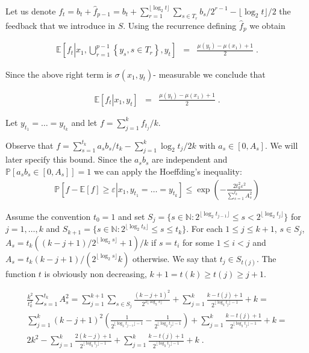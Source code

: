 \documentclass{article}
\numberwithin{equation}{section}
\theoremstyle{plain}
\theoremstyle{plain}
\theoremstyle{plain}
\theoremstyle{remark}
\theoremstyle{remark}
\newcommand{\1}{\ensuremath{\mathbbm{1}}}
\newcommand{\N}{\mathbb{N}}
\newcommand{\E}{\mathbb{E}}
\newcommand{\PP}{\mathbb{P}}
\newcommand{\Dfrac}[2]{{\displaystyle \frac{#1}{#2}}}
\begin{document}
Let us denote $f_{t}=b_{t}+\hat{f}_{p-1}=b_{t}+\sum_{r=1}^{\lfloor\log_{2}t\rfloor}\sum_{s\in T_{r}}b_{s}/2^{r-1}-\lfloor\log_{2}t\rfloor/2$ the feedback that we introduce in $S$. Using the recurrence defining $\hat{f}_{p}$ we obtain

\begin{eqnarray*}
\E\left[f_{t}\left|x_{1},\bigcup_{r=1}^{p-1}\left\{y_{s},s\in T_{r}\right\}, y_{t}\right.\right] &=& \Dfrac{\mu\left(y_{t}\right)-\mu\left(x_{1}\right)+1}{2}\;.
\end{eqnarray*}

Since the above right term is $\sigma(x_{1},y_{t})$- measurable we conclude that

\begin{eqnarray*}
\E\left[f_{t}\left|x_{1},y_{t}\right.\right] &=& \Dfrac{\mu\left(y_{t}\right)-\mu\left(x_{1}\right)+1}{2}\;.
\end{eqnarray*}

Let $y_{t_{1}}=\ldots=y_{t_{k}}$ and let $f=\sum_{j=1}^{k}f_{t_{j}}/k$. 


Observe that $f=\sum_{s=1}^{t_{k}}a_{s}b_{s}/t_{k}-\sum_{j=1}^{k}\log_{2}t_{j}/2k$ with $a_{s}\in[0,A_{s}]$. We will later specify this bound. Since the $a_{s}b_{s}$ are independent and $\PP[a_{s}b_{s}\in[0,A_{s}]]=1$ we can apply the Hoeffding's inequality:
\begin{eqnarray*}
\PP\left[f-\E\left[f\right]\geq\varepsilon\left|x_{1},y_{t_{1}}=\ldots=y_{t_{k}}\right.\right]\leq \exp\left(-\frac{2t_{k}^{2}\varepsilon^{2}}{\sum_{s=1}^{t_{k}}A_{s}^{2}}\right)
\end{eqnarray*}

Assume the convention $t_{0}=1$ and set $S_{j}=\{s\in\N:2^{\lfloor\log_{2} t_{j-1}\rfloor}\leq s<2^{\lfloor\log_{2} t_{j}\rfloor}\}$ for $j=1,\ldots,k$ and $S_{k+1}=\{s\in\N:2^{\lfloor\log_{2} t_{k}\rfloor}\leq s\leq t_{k}\}$. For each $1\leq j\leq k+1$, $s\in S_{j}$, $A_{s}=t_{k}((k-j+1)/2^{\lfloor\log_{2} s\rfloor}+1)/k$ if $s=t_{i}$ for some $1\leq i<j$ and $A_{s}=t_{k}(k-j+1)/(2^{\lfloor\log_{2} s\rfloor}k)$ otherwise. We say that $t_{j}\in S_{t(j)}$. The function $t$ is obviously non decreasing, $k+1=t(k)\geq t(j)\geq j+1$.

\begin{multline*}
\frac{k^{2}}{t_{k}^{2}}\sum\limits_{s=1}^{t_{k}}A_{s}^{2} = \sum\limits_{j=1}^{k+1}\sum\limits_{s\in S_{j}}\frac{(k-j+1)^{2}}{2^{2\lfloor\log_{2} s\rfloor}}+\sum\limits_{j=1}^{k}\frac{k-t(j)+1}{2^{\lfloor\log_{2} t_{j}\rfloor-1}}+k = \\ \sum\limits_{j=1}^{k}(k-j+1)^{2}\left(\frac{1}{2^{\lfloor\log_{2} t_{j-1}\rfloor-1}}-\frac{1}{2^{\lfloor\log_{2} t_{j}\rfloor-1}}\right)+\sum\limits_{j=1}^{k}\frac{k-t(j)+1}{2^{\lfloor\log_{2} t_{j}\rfloor-1}}+k = \\
2k^{2}-\sum\limits_{j=1}^{k}\frac{2(k-j)+1}{2^{\lfloor\log_{2} t_{j}\rfloor-1}} +\sum\limits_{j=1}^{k}\frac{k-t(j)+1}{2^{\lfloor\log_{2} t_{j}\rfloor-1}}+k \;.
\end{multline*}
\end{document}
